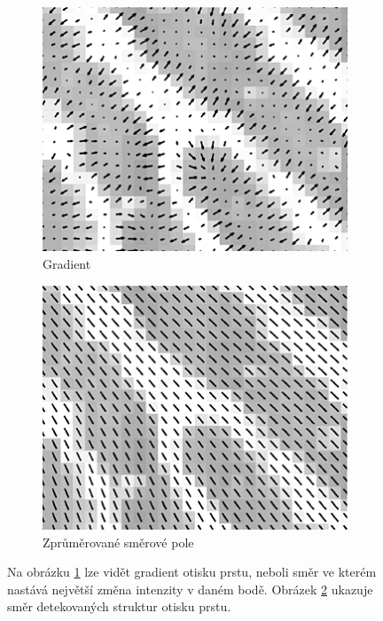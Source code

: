 \begin{figure}[h]\centering
    \centering
    \begin{subfigure}{0.45\textwidth}
    \includegraphics[width=0.9\linewidth]{obrazky-figures/gradient1.png}\hfill
    \caption{Gradient}
    \label{gd_a}
    \end{subfigure}
    \begin{subfigure}{0.45\textwidth}
    \includegraphics[width=0.9\linewidth]{obrazky-figures/gradient2.png}\hfill
    \caption{Zprůměrované směrové pole}
    \label{gd_b}
    \end{subfigure}
    \caption{Na obrázku \ref{gd_a} lze vidět gradient otisku prstu, neboli směr ve kterém nastává největší změna intenzity v daném bodě. Obrázek \ref{gd_b} ukazuje směr detekovaných struktur otisku prstu\protect\footnotemark{}.}
    \label{gradient_directional}
\end{figure}

